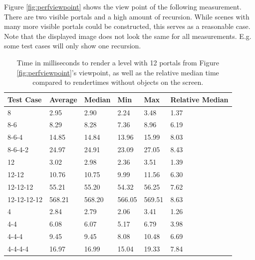 Figure \ref{fig:perfviewpoint} shows the view point of the following measurement. There are two visible portals and a high amount of recursion. While scenes with many more visible portals could be constructed, this serves as a reasonable case. Note that the displayed image does not look the same for all measurements. E.g. some test cases will only show one recursion.

\begin{table}[H]
	\centering
	\label{tab:perfviewpoint}
	\begin{tabular}{|l|l|l|l|l|l|}
		\hline
		Test Case   & Average & Median & Min    & Max    & Relative Median \\ \hline
		8           & 2.95    & 2.90   & 2.24   & 3.48   & 1.37            \\ \hline
		8-6         & 8.29    & 8.28   & 7.36   & 8.96   & 6.19            \\ \hline
		8-6-4       & 14.85   & 14.84  & 13.96  & 15.99  & 8.03            \\ \hline
		8-6-4-2     & 24.97   & 24.91  & 23.09  & 27.05  & 8.43            \\ \hline
		12          & 3.02    & 2.98   & 2.36   & 3.51   & 1.39            \\ \hline
		12-12       & 10.76   & 10.75  & 9.99   & 11.56  & 6.30            \\ \hline
		12-12-12    & 55.21   & 55.20  & 54.32  & 56.25  & 7.62            \\ \hline
		12-12-12-12 & 568.21  & 568.20 & 566.05 & 569.51 & 8.63            \\ \hline
		4           & 2.84    & 2.79   & 2.06   & 3.41   & 1.26            \\ \hline
		4-4         & 6.08    & 6.07   & 5.17   & 6.79   & 3.98            \\ \hline
		4-4-4       & 9.45    & 9.45   & 8.08   & 10.48  & 6.69            \\ \hline
		4-4-4-4     & 16.97   & 16.99  & 15.04  & 19.33  & 7.84            \\ \hline
	\end{tabular}
	\caption{Time in milliseconds to render a level with 12 portals from Figure \ref{fig:perfviewpoint}'s viewpoint, as well as the relative median time compared to rendertimes without objects on the screen.}
\end{table}


